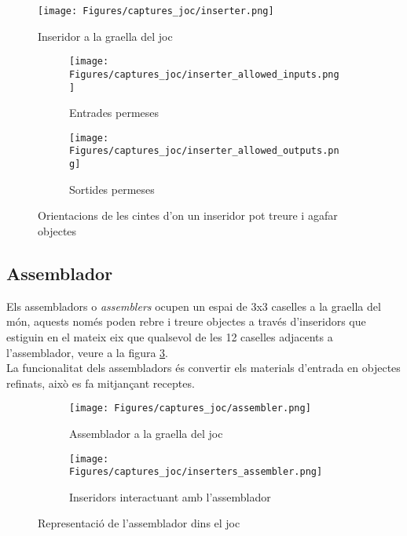 \begin{figure}[H]
    \centering
    \texttt{[image: Figures/captures\_joc/inserter.png]}
    \caption{Inseridor a la graella del joc}
    \label{fig:in_game_inserter}
\end{figure}


\begin{figure}[h]
    \centering
    \begin{subfigure}{0.45\textwidth}
        \texttt{[image: Figures/captures\_joc/inserter\_allowed\_inputs.png]}
        \caption{Entrades permeses}
    \end{subfigure}
    \hfill
    \begin{subfigure}{0.45\textwidth}
        \texttt{[image: Figures/captures\_joc/inserter\_allowed\_outputs.png]}
        \caption{Sortides permeses}
    \end{subfigure}
    \caption{Orientacions de les cintes d'on un inseridor pot treure i agafar objectes}
    \label{fig:inserter_in_out}
\end{figure}

\subsection{Assemblador}
Els assembladors o \textit{assemblers} ocupen un espai de 3x3 caselles a la graella del món, aquests només poden rebre i treure objectes a través d'inseridors que estiguin en el mateix eix que qualsevol de les 12 caselles adjacents a l'assemblador, veure a la figura \ref{fig:ingame_assembler}.\\
La funcionalitat dels assembladors és convertir els materials d'entrada en objectes refinats, això es fa mitjançant receptes.

\begin{figure}[h]
    \centering
    \begin{subfigure}{0.45\textwidth}
        \texttt{[image: Figures/captures\_joc/assembler.png]}
        \caption{Assemblador a la graella del joc}
    \end{subfigure}
    \hfill
    \begin{subfigure}{0.45\textwidth}
        \texttt{[image: Figures/captures\_joc/inserters\_assembler.png]}
        \caption{Inseridors interactuant amb l'assemblador}
    \end{subfigure}
    \caption{Representació de l'assemblador dins el joc}
    \label{fig:ingame_assembler}
\end{figure}

